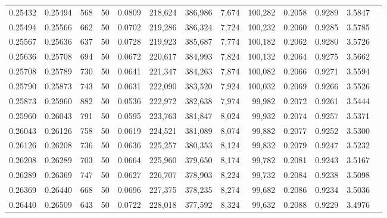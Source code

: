 \begin{tabular}{rrrrrrrrrrrrr}
0.25432 & 0.25494 &   568 &  50 &                                     0.0809 & 218,624 & 386,986 &   7,674 & 100,282 & 0.2058 & 0.9289 & 3.5847 \\
0.25494 & 0.25566 &   662 &  50 &                                     0.0702 & 219,286 & 386,324 &   7,724 & 100,232 & 0.2060 & 0.9285 & 3.5785 \\
0.25567 & 0.25636 &   637 &  50 &                                     0.0728 & 219,923 & 385,687 &   7,774 & 100,182 & 0.2062 & 0.9280 & 3.5726 \\
0.25636 & 0.25708 &   694 &  50 &                                     0.0672 & 220,617 & 384,993 &   7,824 & 100,132 & 0.2064 & 0.9275 & 3.5662 \\
0.25708 & 0.25789 &   730 &  50 &                                     0.0641 & 221,347 & 384,263 &   7,874 & 100,082 & 0.2066 & 0.9271 & 3.5594 \\
0.25790 & 0.25873 &   743 &  50 &                                     0.0631 & 222,090 & 383,520 &   7,924 & 100,032 & 0.2069 & 0.9266 & 3.5526 \\
0.25873 & 0.25960 &   882 &  50 &                                     0.0536 & 222,972 & 382,638 &   7,974 &  99,982 & 0.2072 & 0.9261 & 3.5444 \\
0.25960 & 0.26043 &   791 &  50 &                                     0.0595 & 223,763 & 381,847 &   8,024 &  99,932 & 0.2074 & 0.9257 & 3.5371 \\
0.26043 & 0.26126 &   758 &  50 &                                     0.0619 & 224,521 & 381,089 &   8,074 &  99,882 & 0.2077 & 0.9252 & 3.5300 \\
0.26126 & 0.26208 &   736 &  50 &                                     0.0636 & 225,257 & 380,353 &   8,124 &  99,832 & 0.2079 & 0.9247 & 3.5232 \\
0.26208 & 0.26289 &   703 &  50 &                                     0.0664 & 225,960 & 379,650 &   8,174 &  99,782 & 0.2081 & 0.9243 & 3.5167 \\
0.26289 & 0.26369 &   747 &  50 &                                     0.0627 & 226,707 & 378,903 &   8,224 &  99,732 & 0.2084 & 0.9238 & 3.5098 \\
0.26369 & 0.26440 &   668 &  50 &                                     0.0696 & 227,375 & 378,235 &   8,274 &  99,682 & 0.2086 & 0.9234 & 3.5036 \\
0.26440 & 0.26509 &   643 &  50 &                                     0.0722 & 228,018 & 377,592 &   8,324 &  99,632 & 0.2088 & 0.9229 & 3.4976 \\

\end{tabular}
